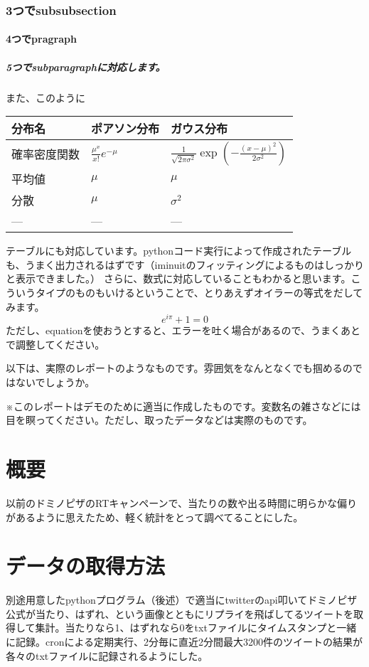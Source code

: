 \subsubsection{3つでsubsubsection}
\paragraph{4つでpragraph}
\subparagraph{5つでsubparagraphに対応します。}
\par また、このように
\begin{table}[H]

\centering\footnotesize
\begin{tabular}{|l|l|l|}
\hline
分布名 & ポアソン分布 & ガウス分布 \\ \hline\hline
確率密度関数 & $\frac{\mu^x}{x!}e^{-\mu}$ & $\frac{1}{\sqrt{2\pi\sigma^2}}\exp\left(-\frac{(x-\mu)^2}{2\sigma^2}\right)$ \\ \hline
平均値 & $\mu$ & $\mu$ \\ \hline
分散 & $\mu$ & $\sigma^2$ \\ \hline
--- & --- & --- \\ \hline
\end{tabular}
\end{table}

\par テーブルにも対応しています。pythonコード実行によって作成されたテーブルも、うまく出力されるはずです（iminuitのフィッティングによるものはしっかりと表示できました。）
さらに、数式に対応していることもわかると思います。こういうタイプのものもいけるということで、とりあえずオイラーの等式をだしてみます。
\[
e^{i\pi}+1=0
\]
ただし、equationを使おうとすると、エラーを吐く場合があるので、うまくあとで調整してください。
\par 以下は、実際のレポートのようなものです。雰囲気をなんとなくでも掴めるのではないでしょうか。

\hrulefill

\par ※このレポートはデモのために適当に作成したものです。変数名の雑さなどには目を瞑ってください。ただし、取ったデータなどは実際のものです。
\section{概要}
\par 以前のドミノピザのRTキャンペーンで、当たりの数や出る時間に明らかな偏りがあるように思えたため、軽く統計をとって調べてることにした。
\section{データの取得方法}
\par 別途用意したpythonプログラム（後述）で適当にtwitterのapi叩いてドミノピザ公式が当たり、はずれ、という画像とともにリプライを飛ばしてるツイートを取得して集計。当たりなら1、はずれなら0をtxtファイルにタイムスタンプと一緒に記録。cronによる定期実行、2分毎に直近2分間最大3200件のツイートの結果が各々のtxtファイルに記録されるようにした。
